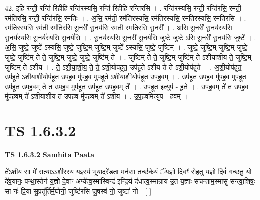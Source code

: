 \documentclass[17pt]{extarticle}
\begin{document}
42. इ॒हि॒ रन्ती॒ रन्ति॑ रिहीहि॒ रन्ति॑रस्यसि॒ रन्ति॑ रिहीहि॒ रन्ति॑रसि । . रन्ति॑रस्यसि॒ रन्ती॒ रन्ति॑रसि॒ रम॑ती॒ रम॑तिरसि॒ रन्ती॒ रन्ति॑रसि॒ रम॑तिः । . अ॒सि॒ रम॑ती॒ रम॑तिरस्यसि॒ रम॑तिरस्यसि॒ रम॑तिरस्यसि॒ रम॑तिरसि । . रम॑तिरस्यसि॒ रम॑ती॒ रम॑तिरसि सू॒नरी॑ सू॒नर्य॑सि॒ रम॑ती॒ रम॑तिरसि सू॒नरी᳚ । . अ॒सि॒ सू॒नरी॑ सू॒नर्य॑स्यसि सू॒नर्य॑स्यसि सू॒नर्य॑स्यसि सू॒नर्य॑सि । . सू॒नर्य॑स्यसि सू॒नरी॑ सू॒नर्य॑सि॒ जुष्टे॒ जुष्टे॑ ऽसि सू॒नरी॑ सू॒नर्य॑सि॒ जुष्टे᳚ । . अ॒सि॒ जुष्टे॒ जुष्टे᳚ ऽस्यसि॒ जुष्टे॒ जुष्टि॒म् जुष्टि॒म् जुष्टे᳚ ऽस्यसि॒ जुष्टे॒ जुष्टि᳚म् । . जुष्टे॒ जुष्टि॒म् जुष्टि॒म् जुष्टे॒ जुष्टे॒ जुष्टि॑म् ते ते॒ जुष्टि॒म् जुष्टे॒ जुष्टे॒ जुष्टि॑म् ते । . जुष्टि॑म् ते ते॒ जुष्टि॒म् जुष्टि॑म् ते ऽशीयाशीय ते॒ जुष्टि॒म् जुष्टि॑म् ते ऽशीय । . ते॒ ऽशी॒या॒शी॒य॒ ते॒ ते॒ ऽशी॒योप॑हूत॒ उप॑हूते ऽशीय ते ते ऽशी॒योप॑हूते । . अ॒शी॒योप॑हूत॒ उप॑हूते ऽशीयाशी॒योप॑हूत उपह॒व मु॑पह॒व मुप॑हूते ऽशीयाशी॒योप॑हूत उपह॒वम् । . उप॑हूत उपह॒व मु॑पह॒व मुप॑हूत॒ उप॑हूत उपह॒वम् ते॑ त उपह॒व मुप॑हूत॒ उप॑हूत उपह॒वम् ते᳚ । . उप॑हूत॒ इत्युप॑ - हू॒ते॒ । . उ॒प॒ह॒वम् ते॑ त उपह॒व मु॑पह॒वम् ते॑ ऽशीयाशीय त उपह॒व मु॑पह॒वम् ते॑ ऽशीय । . उ॒प॒ह॒वमित्यु॑प - ह॒वम् । \newline
\pagebreak
{}

\section{ TS 1.6.3.2 }

\textbf{TS 1.6.3.2 } \newline
\textbf{Samhita Paata} \newline

ते॑ऽशीय॒ सा मे॑ स॒त्याऽऽशीर॒स्य य॒ज्ञ्स्य॑ भूया॒दरे॑डता॒ मन॑सा॒ तच्छ॑केयं ॅय॒ज्ञो दिवꣳ॑ रोहतु य॒ज्ञो दिवं॑ गच्छतु॒ यो दे॑व॒यानः॒ पन्था॒स्तेन॑ य॒ज्ञो दे॒वाꣳ अप्ये᳚त्व॒स्मास्विन्द्र॑ इन्द्रि॒यं द॑धात्व॒स्मान्राय॑ उ॒त य॒ज्ञाः स॑चन्ताम॒स्मासु॑ सन्त्वा॒शिषः॒ सा नः॑ प्रि॒या सु॒प्रतू᳚र्तिर्म॒घोनी॒ जुष्टि॑रसि जु॒षस्व॑ नो॒ जुष्टा॑ नो - [ ] \newline
\end{document}
